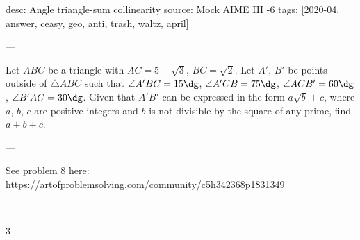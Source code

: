 desc: Angle triangle-sum collinearity
source: Mock AIME III -6
tags: [2020-04, answer, ceasy, geo, anti, trash, waltz, april]

---

Let $ABC$ be a triangle with $AC=5-\sqrt3$, $BC=\sqrt2$. Let $A'$, $B'$ be points outside of $\triangle ABC$ such that $\angle A'BC=15\dg$, $\angle A'CB=75\dg$, $\angle ACB'=60\dg$, $\angle B'AC=30\dg$. Given that $A'B'$ can be expressed in the form $a\sqrt b+c$, where $a$, $b$, $c$ are positive integers and $b$ is not divisible by the square of any prime, find $a+b+c$.

---

See problem 8 here: \url{https://artofproblemsolving.com/community/c5h342368p1831349}

---

3
